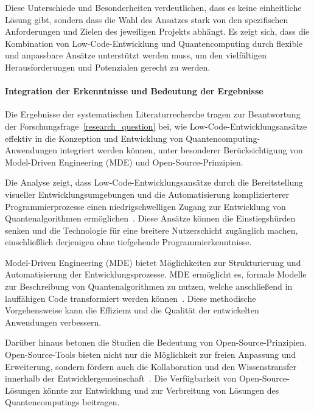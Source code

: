 Diese Unterschiede und Besonderheiten verdeutlichen, dass es keine einheitliche Lösung gibt, sondern dass die Wahl 
des Ansatzes stark von den spezifischen Anforderungen und Zielen des jeweiligen Projekts abhängt. Es zeigt sich, dass 
die Kombination von Low-Code-Entwicklung und Quantencomputing durch flexible und anpassbare Ansätze unterstützt werden 
muss, um den vielfältigen Herausforderungen und Potenzialen gerecht zu werden.

\paragraph{Integration der Erkenntnisse und Bedeutung der Ergebnisse}

Die Ergebnisse der systematischen Literaturrecherche tragen zur Beantwortung der Forschungsfrage~\ref{research_question} bei, 
wie Low-Code-Entwicklungsansätze effektiv in die Konzeption und Entwicklung von Quantencomputing-Anwendungen 
integriert werden können, unter besonderer Berücksichtigung von Model-Driven Engineering (MDE) und Open-Source-Prinzipien.

Die Analyse zeigt, dass Low-Code-Entwicklungsansätze durch die Bereitstellung visueller Entwicklungsumgebungen 
und die Automatisierung komplizierterer Programmierprozesse einen niedrigschwelligen Zugang zur Entwicklung von 
Quantenalgorithmen ermöglichen~\cite{Sahay_2020, Bock_2021}. Diese Ansätze können die Einstiegshürden senken und 
die Technologie für eine breitere Nutzerschicht zugänglich machen, einschließlich derjenigen ohne tiefgehende 
Programmierkenntnisse.

Model-Driven Engineering (MDE) bietet Möglichkeiten zur Strukturierung und Automatisierung der Entwicklungsprozesse. 
MDE ermöglicht es, formale Modelle zur Beschreibung von Quantenalgorithmen zu nutzen, welche anschließend in 
lauffähigen Code transformiert werden können~\cite{Gemeinhardt_2021, Perez-Castillo_2022}. Diese methodische 
Vorgehensweise kann die Effizienz und die Qualität der entwickelten Anwendungen verbessern.

Darüber hinaus betonen die Studien die Bedeutung von Open-Source-Prinzipien. Open-Source-Tools bieten nicht nur 
die Möglichkeit zur freien Anpassung und Erweiterung, sondern fördern auch die Kollaboration und den Wissenstransfer 
innerhalb der Entwicklergemeinschaft~\cite{Amato_2023, Ahmad_2023}. Die Verfügbarkeit von Open-Source-Lösungen 
könnte zur Entwicklung und zur Verbreitung von Lösungen des Quantencomputings beitragen.


